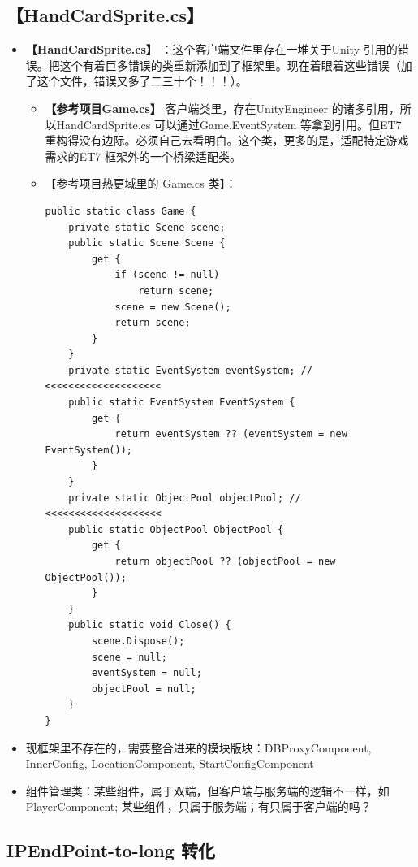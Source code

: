 \documentclass[9pt, b5paper]{article}
\begin{document}
\subsection{【HandCardSprite.cs】}
\label{sec-7-9}
\begin{itemize}
\item \textbf{【HandCardSprite.cs】} ：这个客户端文件里存在一堆关于Unity 引用的错误。把这个有着巨多错误的类重新添加到了框架里。现在着眼着这些错误（加了这个文件，错误又多了二三十个！！！）。
\begin{itemize}
\item \textbf{【参考项目Game.cs】} 客户端类里，存在UnityEngineer 的诸多引用，所以HandCardSprite.cs 可以通过Game.EventSystem 等拿到引用。但ET7 重构得没有边际。必须自己去看明白。这个类，更多的是，适配特定游戏需求的ET7 框架外的一个桥梁适配类。
\item 【参考项目热更域里的 Game.cs 类】：
\begin{verbatim}
public static class Game {
    private static Scene scene;
    public static Scene Scene {
        get {
            if (scene != null) 
                return scene;
            scene = new Scene();
            return scene;
        }
    }
    private static EventSystem eventSystem; // <<<<<<<<<<<<<<<<<<<< 
    public static EventSystem EventSystem {
        get {
            return eventSystem ?? (eventSystem = new EventSystem());
        }
    }
    private static ObjectPool objectPool; // <<<<<<<<<<<<<<<<<<<< 
    public static ObjectPool ObjectPool {
        get {
            return objectPool ?? (objectPool = new ObjectPool());
        }
    }
    public static void Close() {
        scene.Dispose();
        scene = null;
        eventSystem = null;
        objectPool = null;
    }
}
\end{verbatim}
\end{itemize}
\item 现框架里不存在的，需要整合进来的模块版块：DBProxyComponent, InnerConfig, LocationComponent, StartConfigComponent
\item 组件管理类：某些组件，属于双端，但客户端与服务端的逻辑不一样，如PlayerComponent; 某些组件，只属于服务端；有只属于客户端的吗？
\end{itemize}
\subsection{IPEndPoint-to-long 转化}
\label{sec-7-10}
\end{document}
